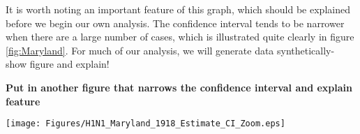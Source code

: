 \documentclass[10pt,journal,compsoc]{IEEEtran}
\begin{document}
 It is worth noting an important feature of this graph, which should be explained before we begin our own analysis. The confidence interval tends to be narrower when there are a large number of cases, which is illustrated quite clearly in figure \ref{fig:Maryland}. For much of our analysis, we will generate data synthetically- show figure and explain!
 
 \textbf{Put in another figure that narrows the confidence interval and explain feature}
 
 \begin{minipage}{\linewidth}
\centering
\texttt{[image: Figures/H1N1\_Maryland\_1918\_Estimate\_CI\_Zoom.eps]}
\label{fig:Maryland}
\end{minipage}
 
 
\end{document}
